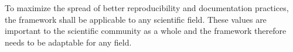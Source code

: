 To maximize the spread of better \gls{reproducibility} and documentation practices, the framework shall be applicable to any scientific field. These values are important to the scientific community as a whole and the framework therefore needs to be adaptable for any field.










